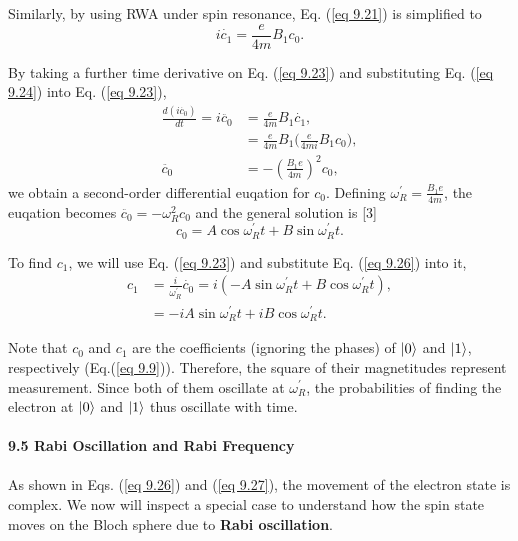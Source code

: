 \documentclass{article}
\begin{document}
Similarly, by using RWA under spin resonance, Eq. (\ref{eq 9.21}) is simplified to
\begin{equation}\label{eq 9.24}
    i\dot{c_1}=\frac{e}{4m}B_1c_0. \tag{9.24}
\end{equation}

By taking a further time derivative on Eq. (\ref{eq 9.23}) and substituting Eq. (\ref{eq 9.24}) into Eq. (\ref{eq 9.23}),
\begin{align*}\label{eq 9.25}
    \frac{d(i\dot{c_0})}{dt}=i\ddot{c_0}&=\frac{e}{4m}B_1\dot{c_1},\\
    &=\frac{e}{4m}B_1\big(\frac{e}{4mi}B_1c_0\big),\\
    \ddot{c_0}&=-(\frac{B_1e}{4m})^2c_0,\tag{9.25}
\end{align*} 
we obtain a second-order differential euqation for $c_0$. Defining $\omega_R^\prime=\frac{B_1e}{4m}$, the euqation becomes
$\ddot{c_0}=-\omega_R^2c_0$ and the general solution is [3]
\begin{equation}\label{eq 9.26}
    c_0=A\cos\omega_R^\prime t+B\sin\omega_R^\prime t.\tag{9.26}
\end{equation}

To find $c_1$, we will use Eq. (\ref{eq 9.23}) and substitute Eq. (\ref{eq 9.26}) into it,
\begin{align*}\label{eq 9.27}
    c_1&=\frac{i}{\omega_R^\prime}\dot{c_0}=i(-A\sin\omega_R^\prime t+B\cos\omega_R^\prime t),\\
    &=-iA\sin\omega_R^\prime t+iB\cos\omega_R^\prime t.\tag{9.27}
\end{align*}

Note that $c_0$ and $c_1$ are the coefficients (ignoring the phases) of $\ket{0}$ and $\ket{1}$, respectively (Eq.(\ref{eq 9.9})).
Therefore, the square of their magnetitudes represent measurement. Since both of them oscillate at $\omega_R^\prime$, the probabilities of finding
the electron at $\ket{0}$ and $\ket{1}$ thus oscillate with time.\\\\
\textbf{\large 9.5 Rabi Oscillation and Rabi Frequency}\\\\
As shown in Eqs. (\ref{eq 9.26}) and (\ref{eq 9.27}), the movement of the electron state is complex. We now will inspect a special case 
to understand how the spin state moves on the Bloch sphere due to \textbf{Rabi oscillation}.
\end{document}
